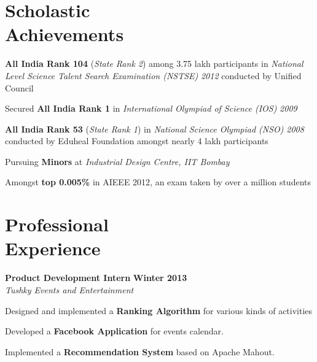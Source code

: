 \documentclass[margin,11pt]{resume}
\begin{document}
\begin{resume}
\vspace{70pt}
    \section{\mysidestyle Scholastic\\Achievements}
   \begin{list2}
\item \textbf{All India Rank 104} (\textsl{State Rank 2}) among 3.75 lakh participants in \textsl{National Level Science Talent Search Examination (NSTSE)} \textsl{2012} conducted by Unified Council
\item Secured \textbf{All India Rank 1} in \textsl{International Olympiad of Science (IOS)} \textsl{2009}
\item \textbf{All India Rank 53} (\textsl{State Rank 1}) in \textsl{National Science Olympiad (NSO)} \textsl{2008} conducted by Eduheal Foundation amongst nearly 4 lakh participants
\item Pursuing \textbf{Minors} at \textsl{Industrial Design Centre, IIT Bombay}
\item Amongst \textbf{top 0.005\%} in AIEEE 2012, an exam taken by over a million students


 \end{list2}
 
    \section{\mysidestyle Professional \\ Experience}
\textbf{Product Development Intern} \hfill \textbf{Winter 2013}\\
\textsl{Tushky Events and Entertainment}
\begin{list2}
\item Designed and implemented a \textbf{Ranking Algorithm} for various kinds of activities
\item Developed a \textbf{Facebook Application} for events calendar.
\item Implemented a \textbf{Recommendation System} based on Apache Mahout.
\end{list2}
 
 
 

\end{resume}
\end{document}
